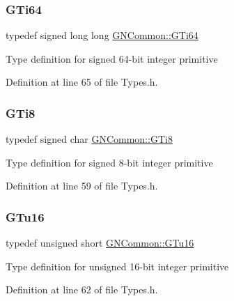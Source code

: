 \mbox{\label{namespace_g_n_common_aa8cf8a182d3e48f629056ff975f607ed}} 
\subsubsection{\texorpdfstring{G\+Ti64}{GTi64}}
{\footnotesize\ttfamily typedef signed long long \mbox{\hyperlink{namespace_g_n_common_aa8cf8a182d3e48f629056ff975f607ed}{G\+N\+Common\+::\+G\+Ti64}}}

Type definition for signed 64-\/bit integer primitive 

Definition at line 65 of file Types.\+h.

\mbox{\label{namespace_g_n_common_ae28c69bd0651262bb808483447a43563}} 
\subsubsection{\texorpdfstring{G\+Ti8}{GTi8}}
{\footnotesize\ttfamily typedef signed char \mbox{\hyperlink{namespace_g_n_common_ae28c69bd0651262bb808483447a43563}{G\+N\+Common\+::\+G\+Ti8}}}

Type definition for signed 8-\/bit integer primitive 

Definition at line 59 of file Types.\+h.

\mbox{\label{namespace_g_n_common_a505de69afe5b556e7537ee63e9172c40}} 
\subsubsection{\texorpdfstring{G\+Tu16}{GTu16}}
{\footnotesize\ttfamily typedef unsigned short \mbox{\hyperlink{namespace_g_n_common_a505de69afe5b556e7537ee63e9172c40}{G\+N\+Common\+::\+G\+Tu16}}}

Type definition for unsigned 16-\/bit integer primitive 

Definition at line 62 of file Types.\+h.

\mbox{\label{namespace_g_n_common_ae5485474bc8f23e462e920a17b377b53}} 
